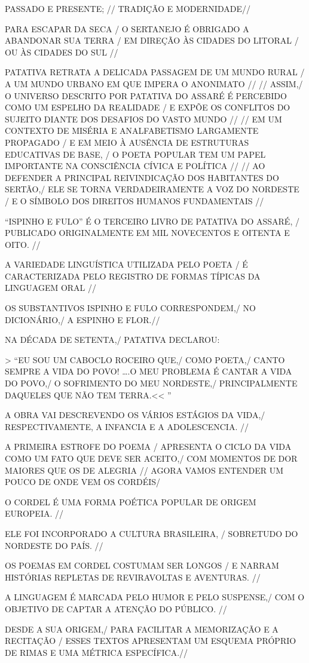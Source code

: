 \documentclass[12pt]{extarticle}
\begin{document}
PASSADO  E PRESENTE; //
TRADIÇÃO E MODERNIDADE//

PARA ESCAPAR DA SECA / O SERTANEJO É OBRIGADO A ABANDONAR SUA TERRA / EM DIREÇÃO ÀS CIDADES DO LITORAL / OU ÀS CIDADES DO SUL //

PATATIVA RETRATA A DELICADA PASSAGEM DE UM MUNDO RURAL / A UM MUNDO URBANO EM QUE IMPERA O ANONIMATO //
//
ASSIM,/ O UNIVERSO DESCRITO POR PATATIVA DO ASSARÉ É PERCEBIDO COMO UM ESPELHO DA REALIDADE / E EXPÕE OS CONFLITOS DO SUJEITO DIANTE DOS DESAFIOS DO VASTO MUNDO //
//
EM UM CONTEXTO DE MISÉRIA E ANALFABETISMO LARGAMENTE PROPAGADO / E EM MEIO À AUSÊNCIA DE ESTRUTURAS EDUCATIVAS DE BASE, / O POETA POPULAR TEM UM PAPEL IMPORTANTE NA CONSCIÊNCIA CÍVICA E POLÍTICA //
//
AO DEFENDER A PRINCIPAL REIVINDICAÇÃO DOS HABITANTES DO SERTÃO,/ ELE SE TORNA VERDADEIRAMENTE A VOZ DO NORDESTE / E O SÍMBOLO DOS DIREITOS HUMANOS FUNDAMENTAIS //

“ISPINHO E FULO” É O TERCEIRO LIVRO DE PATATIVA DO ASSARÉ, /  PUBLICADO ORIGINALMENTE EM MIL NOVECENTOS E OITENTA E OITO. //
 
A VARIEDADE LINGUÍSTICA UTILIZADA PELO POETA / É CARACTERIZADA PELO REGISTRO DE FORMAS TÍPICAS DA LINGUAGEM ORAL //
 
OS SUBSTANTIVOS ISPINHO E FULO CORRESPONDEM,/ NO DICIONÁRIO,/ A ESPINHO E FLOR.//
 
NA DÉCADA DE SETENTA,/ PATATIVA DECLAROU:

>  “EU SOU UM CABOCLO ROCEIRO QUE,/ COMO POETA,/ CANTO SEMPRE A VIDA DO POVO! ….O MEU PROBLEMA É CANTAR A VIDA DO POVO,/ O SOFRIMENTO DO MEU NORDESTE,/ PRINCIPALMENTE DAQUELES QUE NÃO TEM TERRA.<< ”
 
A OBRA VAI DESCREVENDO OS VÁRIOS ESTÁGIOS DA VIDA,/ RESPECTIVAMENTE, A INFANCIA E A ADOLESCENCIA. //
 
A PRIMEIRA ESTROFE DO POEMA / APRESENTA O CICLO DA VIDA COMO UM FATO QUE DEVE SER ACEITO,/ COM MOMENTOS DE DOR MAIORES QUE OS DE ALEGRIA
//
AGORA VAMOS ENTENDER UM POUCO DE ONDE VEM OS CORDÉIS/

O CORDEL É UMA FORMA POÉTICA POPULAR DE ORIGEM EUROPEIA. //
 
ELE FOI INCORPORADO A CULTURA BRASILEIRA, / SOBRETUDO DO NORDESTE DO PAÍS. //
 
OS POEMAS EM CORDEL COSTUMAM SER LONGOS / E NARRAM HISTÓRIAS REPLETAS DE REVIRAVOLTAS E AVENTURAS. //
 
A LINGUAGEM É MARCADA PELO HUMOR E PELO SUSPENSE,/ COM O OBJETIVO DE CAPTAR A ATENÇÃO DO PÚBLICO. //
 
DESDE A SUA ORIGEM,/ PARA FACILITAR A MEMORIZAÇÃO E A RECITAÇÃO / ESSES TEXTOS APRESENTAM UM ESQUEMA PRÓPRIO DE RIMAS E UMA MÉTRICA ESPECÍFICA.//
 
\end{document}
